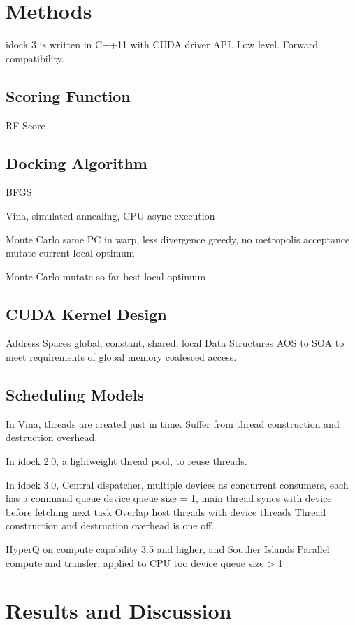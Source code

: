 \documentclass[10pt, conference, compsocconf]{../IEEEtran}
\begin{document}

\section{Methods}

idock 3 is written in C++11 with CUDA driver API. Low level. Forward compatibility.

\subsection{Scoring Function}
RF-Score

\subsection{Docking Algorithm}
BFGS

Vina, simulated annealing, CPU async execution

Monte Carlo
same PC in warp, less divergence
greedy, no metropolis acceptance
mutate current local optimum

Monte Carlo
mutate so-far-best local optimum

\subsection{CUDA Kernel Design}

Address Spaces
global, constant, shared, local
Data Structures
AOS to SOA to meet requirements of global memory coalesced access.

\subsection{Scheduling Models}

In Vina, threads are created just in time. Suffer from thread construction and destruction overhead.

In idock 2.0, a lightweight thread pool, to reuse threads.

In idock 3.0, 
Central dispatcher, multiple devices as concurrent consumers, each has a command queue
device queue size = 1, main thread syncs with device before fetching next task
Overlap host threads with device threads
Thread construction and destruction overhead is one off.

HyperQ on compute capability 3.5 and higher, and Souther Islands
Parallel compute and transfer, applied to CPU too
device queue size > 1

\section{Results and Discussion}
\end{document}
